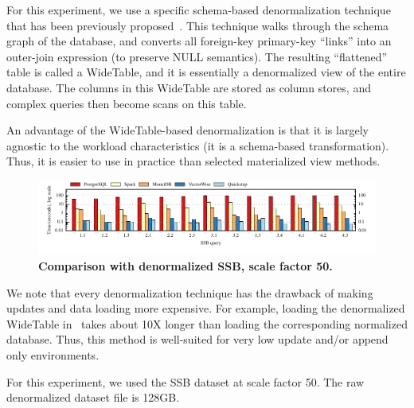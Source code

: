 For this experiment, we use a specific schema-based denormalization technique that has been previously proposed~\cite{widetable}. This technique walks through the schema graph of the database, and converts all foreign-key primary-key ``links'' into an outer-join expression (to preserve NULL semantics). The resulting ``flattened'' table is called a WideTable, and it is essentially a denormalized view of the entire database. The columns in this WideTable are stored as column stores, and complex queries then become scans on this table.

An advantage of the WideTable-based denormalization is that it is largely agnostic to the workload characteristics (it is a schema-based transformation). Thus, it is easier to use in practice than selected materialized view methods.

\begin{figure}
	\center
	\includegraphics[]{system/figures/all-ssb-wt50.pdf}
	\caption{\textbf{Comparison with denormalized SSB, scale factor 50.}}
	\label{fig-ssb-sf50-widetable}
\end{figure}

We note that every denormalization technique has the drawback of making updates and data loading more expensive. For example, loading the denormalized WideTable in \Quickstep\ takes about 10X longer than loading the corresponding normalized database. Thus, this method is well-suited for very low update and/or append only environments.

For this experiment, we used the SSB dataset at scale factor 50. The raw denormalized dataset file is 128GB.

